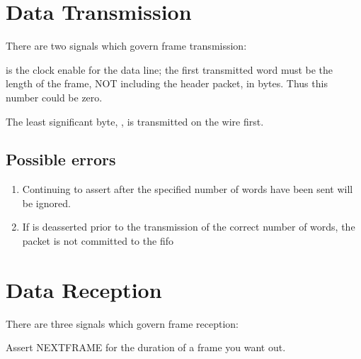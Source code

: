 

\section{Data Transmission}

There are two signals which govern frame transmission: 



 is the clock enable for the data line; the first transmitted
word must be the length of the frame, NOT including the header packet, in bytes. 
Thus this number could be zero. 

The least significant byte, , is transmitted on the
wire first.

\subsection{Possible errors}
\begin{enumerate}
\item Continuing to assert  after the specified
  number of words have been sent will be ignored.
\item If  is deasserted prior to the transmission of the correct number of words, the packet is not committed to the fifo
\end{enumerate}


\section{Data Reception}

There are three signals which govern frame reception: 


Assert NEXTFRAME for the duration of a frame you want out. 

